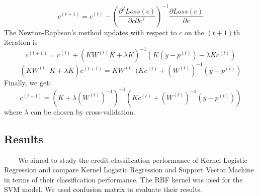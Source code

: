 \documentclass[11pt, oneside]{article}   	%
\begin{document}
\vspace{6pt}
\begin{equation}
c^{(t+1)}=c^{(t)}-\left(\frac{\partial^2{Loss(c)}}{\partial{c}\partial{c^{\top}}}\right)^{-1}\frac{\partial{Loss(c)}}{\partial{c}}
\end{equation}
The Newton-Raphson's method updates with respect to $c$ on the $(t + 1)$th iteration is
\begin{equation}
c^{(t+1)}=c^{(t)}+(KW^{(t)}K+\lambda K)^{-1}(K(y-p^{(t)})-\lambda Kc^{(t)})
\end{equation}
\begin{equation}
(KW^{(t)}K+\lambda K)c^{(t+1)}=KW^{(t)}(Kc^{(t)}+{(W^{(t)})}^{-1}(y-p^{(t)})
\end{equation}
Finally, we get:
\begin{equation}
c^{(t+1)}=\left(K+\lambda{(W^{(t)})}^{-1}\right)^{-1}\left(Kc^{(t)}+{(W^{(t)})}^{-1}(y-p^{(t)})\right)
\end{equation}
where $\lambda$ can be chosen by cross-validation.

\subsection{Results}
~~~~We aimed to study the credit classification performance of Kernel Logistic Regression and compare Kernel Logistic Regression and Support Vector Machine in terms of their classification performance. The RBF kernel was used for the SVM model. We used confusion matrix to evaluate their results.
\end{document}
